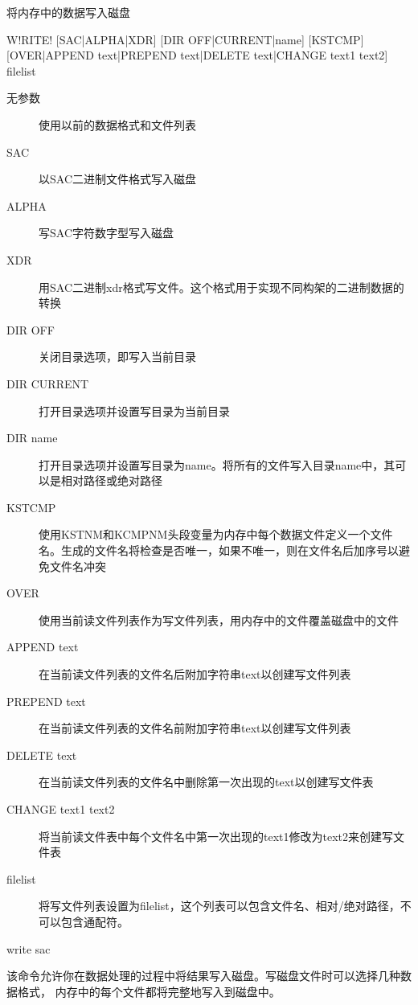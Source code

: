 \label{cmd:write}

将内存中的数据写入磁盘

\begin{SACSTX}
W!RITE! [SAC|ALPHA|XDR] [DIR OFF|CURRENT|name] [KSTCMP]
    [OVER|APPEND text|PREPEND text|DELETE text|CHANGE text1 text2]
    filelist
\end{SACSTX}

\begin{description}
\item [无参数] 使用以前的数据格式和文件列表
\item [SAC] 以SAC二进制文件格式写入磁盘
\item [ALPHA] 写SAC字符数字型写入磁盘
\item [XDR] 用SAC二进制xdr格式写文件。这个格式用于实现不同构架的二进制数据的转换
\item [DIR OFF] 关闭目录选项，即写入当前目录
\item [DIR CURRENT] 打开目录选项并设置写目录为当前目录
\item [DIR name] 打开目录选项并设置写目录为name。将所有的文件写入目录name中，其可以是相对路径或绝对路径
\item [KSTCMP] 使用KSTNM和KCMPNM头段变量为内存中每个数据文件定义一个文件名。生成的文件名将检查是否唯一，如果不唯一，则在文件名后加序号以避免文件名冲突
\item [OVER] 使用当前读文件列表作为写文件列表，用内存中的文件覆盖磁盘中的文件
\item [APPEND text] 在当前读文件列表的文件名后附加字符串text以创建写文件列表
\item [PREPEND text] 在当前读文件列表的文件名前附加字符串text以创建写文件列表
\item [DELETE text] 在当前读文件列表的文件名中删除第一次出现的text以创建写文件表
\item [CHANGE text1 text2] 将当前读文件表中每个文件名中第一次出现的text1修改为text2来创建写文件表
\item [filelist] 将写文件列表设置为filelist，这个列表可以包含文件名、相对/绝对路径，不可以包含通配符。
\end{description}

\begin{SACDFT}
write sac
\end{SACDFT}

该命令允许你在数据处理的过程中将结果写入磁盘。写磁盘文件时可以选择几种数据格式，
内存中的每个文件都将完整地写入到磁盘中。

